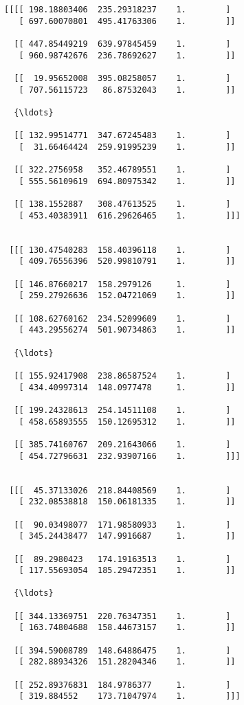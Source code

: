\documentclass[11pt]{article}
\begin{document}
    \begin{Verbatim}[commandchars=\\\{\}]
[[[[ 198.18803406  235.29318237    1.        ]
   [ 697.60070801  495.41763306    1.        ]]

  [[ 447.85449219  639.97845459    1.        ]
   [ 960.98742676  236.78692627    1.        ]]

  [[  19.95652008  395.08258057    1.        ]
   [ 707.56115723   86.87532043    1.        ]]

  {\ldots}

  [[ 132.99514771  347.67245483    1.        ]
   [  31.66464424  259.91995239    1.        ]]

  [[ 322.2756958   352.46789551    1.        ]
   [ 555.56109619  694.80975342    1.        ]]

  [[ 138.1552887   308.47613525    1.        ]
   [ 453.40383911  616.29626465    1.        ]]]


 [[[ 130.47540283  158.40396118    1.        ]
   [ 409.76556396  520.99810791    1.        ]]

  [[ 146.87660217  158.2979126     1.        ]
   [ 259.27926636  152.04721069    1.        ]]

  [[ 108.62760162  234.52099609    1.        ]
   [ 443.29556274  501.90734863    1.        ]]

  {\ldots}

  [[ 155.92417908  238.86587524    1.        ]
   [ 434.40997314  148.0977478     1.        ]]

  [[ 199.24328613  254.14511108    1.        ]
   [ 458.65893555  150.12695312    1.        ]]

  [[ 385.74160767  209.21643066    1.        ]
   [ 454.72796631  232.93907166    1.        ]]]


 [[[  45.37133026  218.84408569    1.        ]
   [ 232.08538818  150.06181335    1.        ]]

  [[  90.03498077  171.98580933    1.        ]
   [ 345.24438477  147.9916687     1.        ]]

  [[  89.2980423   174.19163513    1.        ]
   [ 117.55693054  185.29472351    1.        ]]

  {\ldots}

  [[ 344.13369751  220.76347351    1.        ]
   [ 163.74804688  158.44673157    1.        ]]

  [[ 394.59008789  148.64886475    1.        ]
   [ 282.88934326  151.28204346    1.        ]]

  [[ 252.89376831  184.9786377     1.        ]
   [ 319.884552    173.71047974    1.        ]]]



\end{Verbatim}
\end{document}
